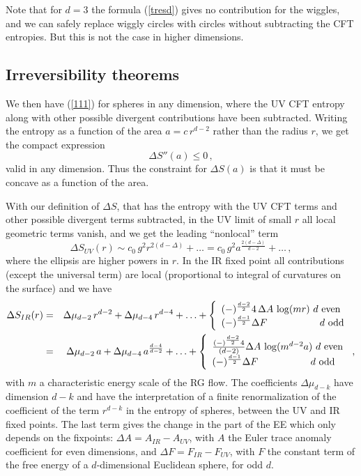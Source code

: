 \documentclass[12pt]{article}
\numberwithin{equation}{section}
\newcommand\eea{\end{eqnarray}}
\newcommand\bea{\begin{eqnarray}}
\newcommand{\be}{\begin{equation}}
\newcommand{\ee}{\end{equation}}
\begin{document}
Note that for $d=3$ the formula (\ref{tresd}) gives no contribution for the wiggles, and we can safely replace wiggly circles with circles without subtracting the CFT entropies. But this is not the case in higher dimensions. 
  

\subsection{Irreversibility theorems}


We then have (\ref{111}) for spheres in any dimension, where the UV CFT entropy along with other possible divergent contributions have been subtracted.
Writing the entropy as a function of the area $a=c \,r^{d-2}$ rather than the radius $r$, we get the compact expression
\be
\Delta S''(a)\le 0\,, \label{sisi}
\ee 
valid in any dimension. Thus the constraint for $\Delta S(a)$ is that it must be concave as a function of the area.

 With our definition of $\Delta S$, that has the entropy with the UV CFT terms and other possible divergent terms subtracted, in the UV limit of small $r$ all local geometric terms vanish, and we get the leading ``nonlocal'' term 
\be
\Delta S_{UV}(r) \sim  c_0 \,g^2 r^{2(d-\Delta)}+\ldots =c_0\, g^2 a^{\frac{2(d-\Delta)}{d-2}}+\ldots\,,\label{oyo1}
\ee
where the ellipsis are higher powers in $r$. In the IR fixed point all contributions (except the universal term) are local (proportional to integral of curvatures on the surface) and we have
\bea 
\Delta S_{IR}(r)&=&\Delta \mu_{d-2}\,r^{d-2}+\Delta \mu_{d-4}\, r^{d-4}+\ldots  + \left\lbrace \begin{array}{l} (-)^{\frac{d-2}{2}} 4\,\Delta A\, \log(m r)\,\, d \,\, \textrm{even}\\ (-)^{\frac{d-1}{2}} \Delta F \hspace{1.9cm}d\,\,\textrm{odd }  \end{array}\right.\,\nonumber\\
\label{even1}
&=&\Delta \mu_{d-2}\, a +\Delta \mu_{d-4}\, a^{\frac{d-4}{d-2}}+\ldots  
  + \left\lbrace \begin{array}{l} \frac{(-)^{\frac{d-2}{2}} 4}{(d-2)}\Delta A\, \log(m^{d-2}a)\,\, d \,\, \textrm{even}\\ (-)^{\frac{d-1}{2}} \Delta F \hspace{1.9cm}d\,\,\textrm{odd }  \end{array}\right.\,,
\eea
with $m$ a characteristic energy scale of the RG flow.    
The coefficients $\Delta \mu_{d-k}$ have dimension $d-k$ and have the interpretation of a finite renormalization of the coefficient of the term $r^{d-k}$ in the entropy of spheres,  between the UV and IR fixed points. The last term gives the change in the part of the EE which only depends on the fixpoints: $\Delta A=A_{IR}-A_{UV}$, with $A$ the Euler trace anomaly coefficient for even dimensions, and $\Delta F=F_{IR}-F_{UV}$, with $F$ the constant term of the free energy of a $d$-dimensional Euclidean sphere, for odd $d$. 
\end{document}
